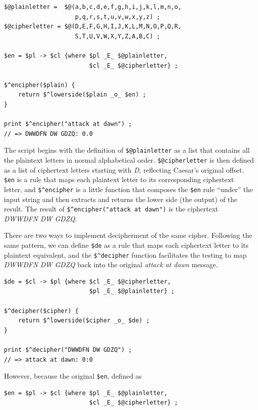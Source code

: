\begin{Verbatim}
$@plainletter =  $@(a,b,c,d,e,f,g,h,i,j,k,l,m,n,o,
                    p,q,r,s,t,u,v,w,x,y,z) ;
$@cipherletter = $@(D,E,F,G,H,I,J,K,L,M,N,O,P,Q,R,
                    S,T,U,V,W,X,Y,Z,A,B,C) ;

$en = $pl -> $cl {where $pl _E_ $@plainletter,
                        $cl _E_ $@cipherletter} ;

$^encipher($plain) {
    return $^lowerside($plain _o_ $en) ;
}

print $^encipher("attack at dawn") ;
// => DWWDFN DW GDZQ: 0.0
\end{Verbatim}



The script begins with the definition of \texttt{\$@plainletter} as a list that contains all the plaintext letters in
normal alphabetical order.  \texttt{\$@cipherletter} is then defined as a list of ciphertext letters starting with \emph{D},
reflecting Caesar's original offset.
\texttt{\$en} is a rule that maps each plaintext letter to its corresponding ciphertext letter, and \verb!$^encipher! is a
little function that composes the \verb!$en! rule ``under'' the input string and then extracts and returns the lower side
(the output) of the result.  The result of \verb!$^encipher("attack at dawn")! is the ciphertext \emph{DWWDFN DW GDZQ}.

There are two ways to implement decipherment of the same cipher.  Following the same pattern, we can define \verb!$de! as
a rule that maps each ciphertext letter to its plaintext equivalent, and the \verb!$^decipher! function facilitates the
testing to map \emph{DWWDFN DW GDZQ} back into the original \emph{attack at dawn} message.

\begin{Verbatim}
$de = $cl -> $pl {where $cl _E_ $@cipherletter,
                        $pl _E_ $@plainletter} ;

$^decipher($cipher) {
    return $^lowerside($cipher _o_ $de) ;
}

print $^decipher("DWWDFN DW GDZQ") ;
// => attack at dawn: 0:0
\end{Verbatim}

However, because the original \verb!$en!, defined as


\begin{Verbatim}
$en = $pl -> $cl {where $pl _E_ $@plainletter,
                        $cl _E_ $@cipherletter} ;
\end{Verbatim}


